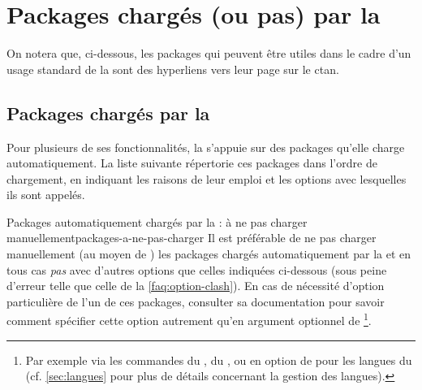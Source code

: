 \chapter{Packages chargés (ou pas) par la \yatcl{}}\label{cha:packages-charges}

On notera que, ci-dessous, les packages qui peuvent être utiles dans le cadre
d'un usage standard de la \yatcl{} sont des hyperliens vers leur page sur le
\gls{ctan}.

\section{Packages chargés par la \yatcl{}}
\label{sec:packages-charges-par}

Pour plusieurs de ses fonctionnalités, la \yatcl s'appuie sur des packages
qu'elle charge automatiquement. La liste suivante répertorie ces packages dans
l'ordre de chargement, en indiquant les raisons de leur emploi et les options
avec lesquelles ils sont appelés.

\begin{dbwarning}{Packages automatiquement chargés par la \yatcl{} : à ne pas
    charger manuellement}{packages-a-ne-pas-charger}
  Il est préférable de ne pas charger manuellement (au moyen de
  ) les packages chargés automatiquement par la
  \yatcl{} et en tous cas \emph{pas} avec d'autres options que celles indiquées
  ci-dessous (sous peine d'erreur telle que celle de la
  \vref{faq:option-clash}). En cas de nécessité d'option particulière de l'un
  de ces packages, consulter sa documentation pour savoir comment spécifier
  cette option autrement qu'en argument optionnel de
  \footnote{Par exemple via les commandes
     du ,
     du , ou en option de
     pour les langues du 
    (cf. \vref{sec:langues} pour plus de détails concernant la gestion des
    langues).}.
\end{dbwarning}

